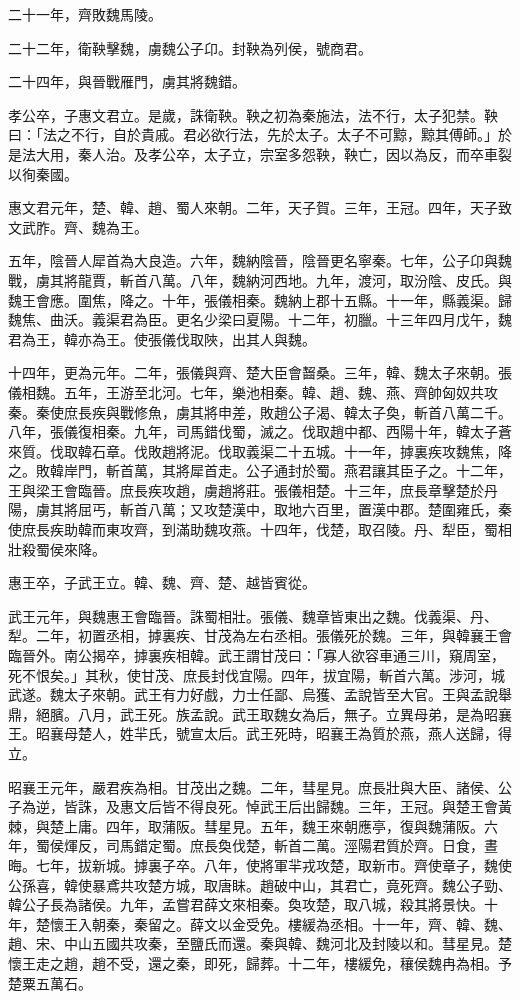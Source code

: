 \begin{pinyinscope}
二十一年，齊敗魏馬陵。

二十二年，衛鞅擊魏，虜魏公子卬。封鞅為列侯，號商君。

二十四年，與晉戰雁門，虜其將魏錯。

孝公卒，子惠文君立。是歲，誅衛鞅。鞅之初為秦施法，法不行，太子犯禁。鞅曰：「法之不行，自於貴戚。君必欲行法，先於太子。太子不可黥，黥其傅師。」於是法大用，秦人治。及孝公卒，太子立，宗室多怨鞅，鞅亡，因以為反，而卒車裂以徇秦國。

惠文君元年，楚、韓、趙、蜀人來朝。二年，天子賀。三年，王冠。四年，天子致文武胙。齊、魏為王。

五年，陰晉人犀首為大良造。六年，魏納陰晉，陰晉更名寧秦。七年，公子卬與魏戰，虜其將龍賈，斬首八萬。八年，魏納河西地。九年，渡河，取汾陰、皮氏。與魏王會應。圍焦，降之。十年，張儀相秦。魏納上郡十五縣。十一年，縣義渠。歸魏焦、曲沃。義渠君為臣。更名少梁曰夏陽。十二年，初臘。十三年四月戊午，魏君為王，韓亦為王。使張儀伐取陜，出其人與魏。

十四年，更為元年。二年，張儀與齊、楚大臣會齧桑。三年，韓、魏太子來朝。張儀相魏。五年，王游至北河。七年，樂池相秦。韓、趙、魏、燕、齊帥匈奴共攻秦。秦使庶長疾與戰修魚，虜其將申差，敗趙公子渴、韓太子奐，斬首八萬二千。八年，張儀復相秦。九年，司馬錯伐蜀，滅之。伐取趙中都、西陽十年，韓太子蒼來質。伐取韓石章。伐敗趙將泥。伐取義渠二十五城。十一年，摢裏疾攻魏焦，降之。敗韓岸門，斬首萬，其將犀首走。公子通封於蜀。燕君讓其臣子之。十二年，王與梁王會臨晉。庶長疾攻趙，虜趙將莊。張儀相楚。十三年，庶長章擊楚於丹陽，虜其將屈丐，斬首八萬；又攻楚漢中，取地六百里，置漢中郡。楚圍雍氏，秦使庶長疾助韓而東攻齊，到滿助魏攻燕。十四年，伐楚，取召陵。丹、犁臣，蜀相壯殺蜀侯來降。

惠王卒，子武王立。韓、魏、齊、楚、越皆賓從。

武王元年，與魏惠王會臨晉。誅蜀相壯。張儀、魏章皆東出之魏。伐義渠、丹、犁。二年，初置丞相，摢裏疾、甘茂為左右丞相。張儀死於魏。三年，與韓襄王會臨晉外。南公揭卒，摢裏疾相韓。武王謂甘茂曰：「寡人欲容車通三川，窺周室，死不恨矣。」其秋，使甘茂、庶長封伐宜陽。四年，拔宜陽，斬首六萬。涉河，城武遂。魏太子來朝。武王有力好戲，力士任鄙、烏獲、孟說皆至大官。王與孟說舉鼎，絕臏。八月，武王死。族孟說。武王取魏女為后，無子。立異母弟，是為昭襄王。昭襄母楚人，姓羋氏，號宣太后。武王死時，昭襄王為質於燕，燕人送歸，得立。

昭襄王元年，嚴君疾為相。甘茂出之魏。二年，彗星見。庶長壯與大臣、諸侯、公子為逆，皆誅，及惠文后皆不得良死。悼武王后出歸魏。三年，王冠。與楚王會黃棘，與楚上庸。四年，取蒲阪。彗星見。五年，魏王來朝應亭，復與魏蒲阪。六年，蜀侯煇反，司馬錯定蜀。庶長奐伐楚，斬首二萬。涇陽君質於齊。日食，晝晦。七年，拔新城。摢裏子卒。八年，使將軍羋戎攻楚，取新市。齊使章子，魏使公孫喜，韓使暴鳶共攻楚方城，取唐眛。趙破中山，其君亡，竟死齊。魏公子勁、韓公子長為諸侯。九年，孟嘗君薛文來相秦。奐攻楚，取八城，殺其將景快。十年，楚懷王入朝秦，秦留之。薛文以金受免。樓緩為丞相。十一年，齊、韓、魏、趙、宋、中山五國共攻秦，至鹽氏而還。秦與韓、魏河北及封陵以和。彗星見。楚懷王走之趙，趙不受，還之秦，即死，歸葬。十二年，樓緩免，穰侯魏冉為相。予楚粟五萬石。


\end{pinyinscope}
